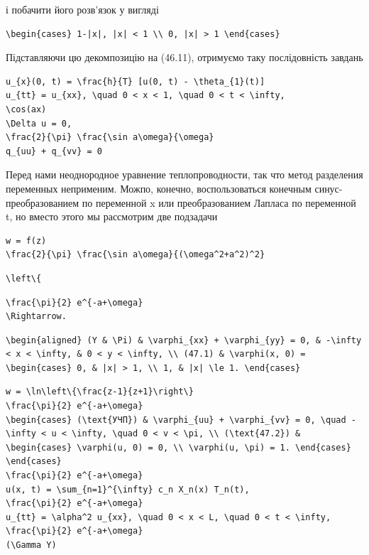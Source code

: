\documentclass[
  ukrainian,
]{article}
\begin{document}
і побачити його розв'язок у вигляді

\begin{verbatim}
\begin{cases} 1-|x|, |x| < 1 \\ 0, |x| > 1 \end{cases}
\end{verbatim}

Підставляючи цю декомпозицію на (46.11), отримуємо таку послідовність
завдань

\begin{verbatim}
u_{x}(0, t) = \frac{h}{T} [u(0, t) - \theta_{1}(t)]
u_{tt} = u_{xx}, \quad 0 < x < 1, \quad 0 < t < \infty,
\cos(ax)
\Delta u = 0,
\frac{2}{\pi} \frac{\sin a\omega}{\omega}
q_{uu} + q_{vv} = 0
\end{verbatim}

Перед нами неоднородное уравнение теплопроводности, так что метод
разделения переменных неприменим. Можпо, конечно, воспользоваться
конечным синус-преобразованием по переменной x или преобразованием
Лапласа по переменной t, но вместо этого мы рассмотрим две подзадачи

\begin{verbatim}
w = f(z)
\frac{2}{\pi} \frac{\sin a\omega}{(\omega^2+a^2)^2}
\end{verbatim}

\begin{verbatim}
\left\{
\end{verbatim}

\begin{verbatim}
\frac{\pi}{2} e^{-a+\omega}
\Rightarrow.
\end{verbatim}

\begin{verbatim}
\begin{aligned} (Y & \Pi) & \varphi_{xx} + \varphi_{yy} = 0, & -\infty < x < \infty, & 0 < y < \infty, \\ (47.1) & \varphi(x, 0) = \begin{cases} 0, & |x| > 1, \\ 1, & |x| \le 1. \end{cases}
\end{verbatim}

\begin{verbatim}
w = \ln\left\{\frac{z-1}{z+1}\right\}
\frac{\pi}{2} e^{-a+\omega}
\begin{cases} (\text{УЧП}) & \varphi_{uu} + \varphi_{vv} = 0, \quad -\infty < u < \infty, \quad 0 < v < \pi, \\ (\text{47.2}) & \begin{cases} \varphi(u, 0) = 0, \\ \varphi(u, \pi) = 1. \end{cases} \end{cases}
\frac{\pi}{2} e^{-a+\omega}
u(x, t) = \sum_{n=1}^{\infty} c_n X_n(x) T_n(t),
\frac{\pi}{2} e^{-a+\omega}
u_{tt} = \alpha^2 u_{xx}, \quad 0 < x < L, \quad 0 < t < \infty,
\frac{\pi}{2} e^{-a+\omega}
(\Gamma Y)
\end{verbatim}
\end{document}
